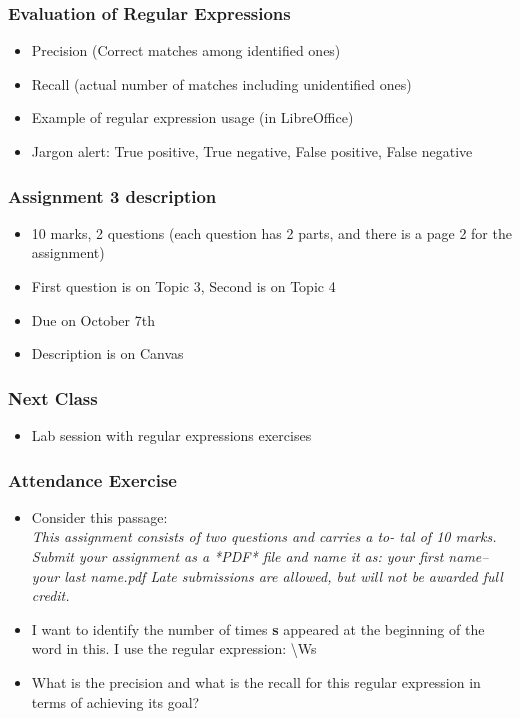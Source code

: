 \documentclass{beamer}
\begin{document}
\begin{frame}
\frametitle{Evaluation of Regular Expressions}
\begin{itemize}
\item Precision (Correct matches among identified ones)
\item Recall (actual number of matches including unidentified ones) \pause
\item Example of regular expression usage (in LibreOffice)
\item Jargon alert: True positive, True negative, False positive, False negative
\end{itemize}
\end{frame}

\begin{frame}
\frametitle{Assignment 3 description}
\begin{itemize}
\item 10 marks, 2 questions (each question has 2 parts, and there is a page 2 for the assignment)
\item First question is on Topic 3, Second is on Topic 4
\item Due on October 7th
\item Description is on Canvas
\end{itemize}
\end{frame}

\begin{frame}
\frametitle{Next Class}
\begin{itemize}
\item Lab session with regular expressions exercises 
\end{itemize}
\end{frame}

\begin{frame}
\frametitle{Attendance Exercise}
\begin{itemize}
\item Consider this passage: \\ \small 
\textit{This assignment consists of two questions and carries a to-
tal of 10 marks. Submit your assignment as a *PDF* file and name it as:
your first name–your last name.pdf Late submissions are allowed, but will
not be awarded full credit.} \normalsize
\item I want to identify the number of times \textbf{s} appeared at the beginning of the word in this. I use the regular expression: \textbackslash Ws
\item What is the precision and what is the recall for this regular expression in terms of achieving its goal?
\end{itemize}
\end{frame}
\end{document}
